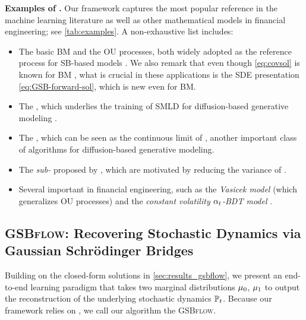 \textbf{Examples of .}
Our framework captures the most popular reference  in the machine learning literature as well as other mathematical models in financial engineering; see \cref{tab:examples}. %
A non-exhaustive list includes:
\begin{itemize}[leftmargin=.5cm,itemsep=.01cm,topsep=0cm]
\item The basic \acrlong{BM} and the \acrfull{OU} processes, both widely adopted as the reference process for \acrshort{SB}-based models \citep{de2021simulating, de2021diffusion, lavenant2021towards, vargas2021solving, wang2021deep}. We also remark that even though \eqref{eq:covsol} is known for \acrshort{BM} \citep{mallasto2021entropy}, what is crucial in these applications is the \acrshort{SDE} presentation \eqref{eq:GSB-forward-sol}, which is new even for BM.
\item The , which underlies the training of \acrlong{SMLD} for diffusion-based generative modeling \citep{huang2021variational, song2019generative, song2020score}.
\item The , which can be seen as the continuous limit of  \citep{ho2020denoising, sohl2015deep, song2020score}, another important class of algorithms for diffusion-based generative modeling.
\item The \emph{sub-} proposed by \citep{song2020score}, which are motivated by reducing the variance of .
\item Several important  in financial engineering, such as the \emph{Vasicek model} (which generalizes \acrshort{OU} processes) and the \emph{constant volatility $\alpha_{ t }$-\acrfull{BDT} model} \citep{platen2010numerical}. 
\end{itemize}

\subsection{\textsc{GSBflow}: Recovering Stochastic Dynamics via Gaussian Schr{\"o}dinger Bridges}

Building on the closed-form solutions in \cref{sec:results_gsbflow}, we present an end-to-end learning paradigm that takes two marginal distributions $\mu_0$, $\mu_1$ to output the reconstruction of the underlying stochastic dynamics $\mathbb{P}_{{t}}$. Because our framework relies on , we call our algorithm the \textsc{GSBflow}. \\

